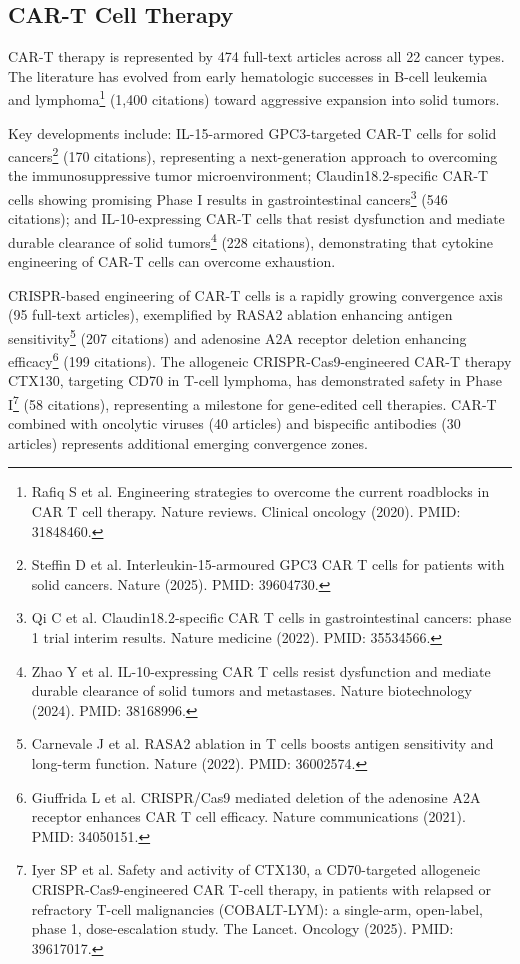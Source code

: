 \documentclass[11pt,twoside,openright]{report}
\begin{document}
\subsection{CAR-T Cell Therapy}

CAR-T therapy is represented by 474 full-text articles across all 22 cancer types. The literature has evolved from early hematologic successes in B-cell leukemia and lymphoma\footnote{Rafiq S et al. Engineering strategies to overcome the current roadblocks in CAR T cell therapy. Nature reviews. Clinical oncology (2020). PMID: 31848460.} (1,400 citations) toward aggressive expansion into solid tumors.

Key developments include: IL-15-armored GPC3-targeted CAR-T cells for solid cancers\footnote{Steffin D et al. Interleukin-15-armoured GPC3 CAR T cells for patients with solid cancers. Nature (2025). PMID: 39604730.} (170 citations), representing a next-generation approach to overcoming the immunosuppressive tumor microenvironment; Claudin18.2-specific CAR-T cells showing promising Phase I results in gastrointestinal cancers\footnote{Qi C et al. Claudin18.2-specific CAR T cells in gastrointestinal cancers: phase 1 trial interim results. Nature medicine (2022). PMID: 35534566.} (546 citations); and IL-10-expressing CAR-T cells that resist dysfunction and mediate durable clearance of solid tumors\footnote{Zhao Y et al. IL-10-expressing CAR T cells resist dysfunction and mediate durable clearance of solid tumors and metastases. Nature biotechnology (2024). PMID: 38168996.} (228 citations), demonstrating that cytokine engineering of CAR-T cells can overcome exhaustion.

CRISPR-based engineering of CAR-T cells is a rapidly growing convergence axis (95 full-text articles), exemplified by RASA2 ablation enhancing antigen sensitivity\footnote{Carnevale J et al. RASA2 ablation in T cells boosts antigen sensitivity and long-term function. Nature (2022). PMID: 36002574.} (207 citations) and adenosine A2A receptor deletion enhancing efficacy\footnote{Giuffrida L et al. CRISPR/Cas9 mediated deletion of the adenosine A2A receptor enhances CAR T cell efficacy. Nature communications (2021). PMID: 34050151.} (199 citations). The allogeneic CRISPR-Cas9-engineered CAR-T therapy CTX130, targeting CD70 in T-cell lymphoma, has demonstrated safety in Phase I\footnote{Iyer SP et al. Safety and activity of CTX130, a CD70-targeted allogeneic CRISPR-Cas9-engineered CAR T-cell therapy, in patients with relapsed or refractory T-cell malignancies (COBALT-LYM): a single-arm, open-label, phase 1, dose-escalation study. The Lancet. Oncology (2025). PMID: 39617017.} (58 citations), representing a milestone for gene-edited cell therapies. CAR-T combined with oncolytic viruses (40 articles) and bispecific antibodies (30 articles) represents additional emerging convergence zones.
\end{document}
